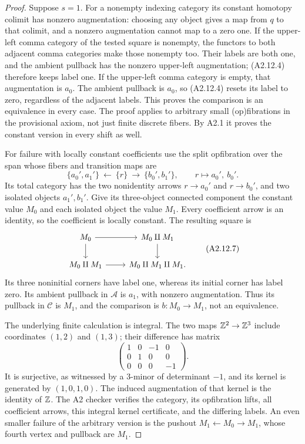 \begin{proof}
Suppose $s=1$. For a nonempty indexing category its constant homotopy
colimit has nonzero augmentation: choosing any object gives a map from
$q$ to that colimit, and a nonzero augmentation cannot map to a zero
one. If the upper-left comma category of the tested square is nonempty,
the functors to both adjacent comma categories make those nonempty too.
Their labels are both one, and the ambient pullback has the nonzero
upper-left augmentation; (A2.12.4) therefore keeps label one. If the
upper-left comma category is empty, that augmentation is $a_0$.
The ambient pullback is $a_0$, so (A2.12.4) resets its label to zero,
regardless of the adjacent labels. This proves the comparison is an
equivalence in every case. The proof applies to arbitrary small
(op)fibrations in the provisional axiom, not just finite discrete fibers.
By A2.1 it proves the constant version in every shift as well.

For failure with locally constant coefficients use the split opfibration
over the span whose fibers and transition maps are
\[
 \{a_0',a_1'\}\ \longleftarrow\ \{r\}\
 \longrightarrow\ \{b_0',b_1'\},
 \qquad r\longmapsto a_0',\ b_0'.
 \tag{A2.12.6}
\]
Its total category has the two nonidentity arrows
$r\to a_0'$ and $r\to b_0'$, and two isolated objects $a_1',b_1'$.
Give its three-object connected component the constant value $M_0$
and each isolated object the value $M_1$. Every coefficient arrow is an
identity, so the coefficient is locally constant. The resulting square is
\[
 \begin{tikzcd}
 M_0\ar[r]\ar[d]&M_0\amalg M_1\ar[d]\\
 M_0\amalg M_1\ar[r]&M_0\amalg M_1\amalg M_1.
 \end{tikzcd}
 \tag{A2.12.7}
\]
Its three noninitial corners have label one, whereas its initial corner
has label zero. Its ambient pullback in $\mathcal A$ is $a_1$, with
nonzero augmentation. Thus its pullback in $\mathcal C$ is $M_1$, and the
comparison is $b:M_0\to M_1$, not an equivalence.

The underlying finite calculation is integral. The two maps
$\mathbb Z^2\to\mathbb Z^3$ include coordinates $(1,2)$ and $(1,3)$; their difference
has matrix
\[
 \begin{pmatrix}1&0&-1&0\\0&1&0&0\\0&0&0&-1\end{pmatrix}.
 \tag{A2.12.8}
\]
It is surjective, as witnessed by a $3$-minor of determinant $-1$,
and its kernel is generated by $(1,0,1,0)$. The induced augmentation
of that kernel is the identity of $\mathbb Z$. The A2 checker verifies the
category, its opfibration lifts, all coefficient arrows, this integral
kernel certificate, and the differing labels.
An even smaller failure of the arbitrary version is the pushout
$M_1\leftarrow M_0\to M_1$, whose fourth vertex and pullback are $M_1$.


\end{proof}
